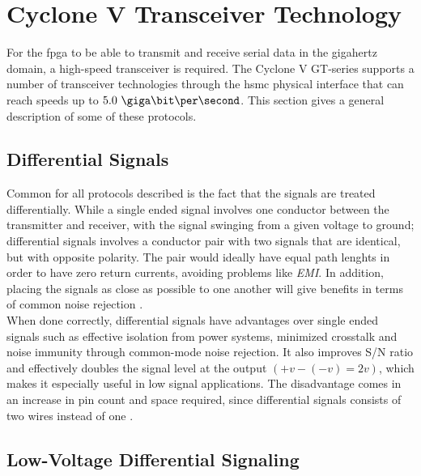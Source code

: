 \documentclass[main.tex]{subfiles}
\begin{document}

\chapter{Cyclone V Transceiver Technology}

For the \gls{fpga} to be able to transmit and receive serial data in the gigahertz domain, a high-speed transceiver is required. The Cyclone V GT-series supports a number of transceiver technologies through the \gls{hsmc} physical interface that can reach speeds up to $5.0\ \giga\bit\per\second$. This section gives a general description of some of these protocols.

\section{Differential Signals} \label{subsec:diffsig}

Common for all protocols described is the fact that the signals are treated differentially. While a single ended signal involves one conductor between the transmitter and receiver, with the signal swinging from a given voltage to ground; differential signals involves a conductor pair with two signals that are identical, but with opposite polarity. The pair would ideally have equal path lenghts in order to have zero return currents, avoiding problems like \textit{EMI}. In addition, placing the signals as close as possible to one another will give benefits in terms of common noise rejection \cite{douglas01}.\\

When done correctly, differential signals have advantages over single ended signals such as effective isolation from power systems, minimized crosstalk and noise immunity through common-mode noise rejection. It also improves S/N ratio and effectively doubles the signal level at the output $(+v - (-v) = 2v)$, which makes it especially useful in low signal applications. The disadvantage comes in an increase in pin count and space required, since differential signals consists of two wires instead of one \cite{douglas01}.

\section{Low-Voltage Differential Signaling} \label{sec:lvds}
\end{document}
